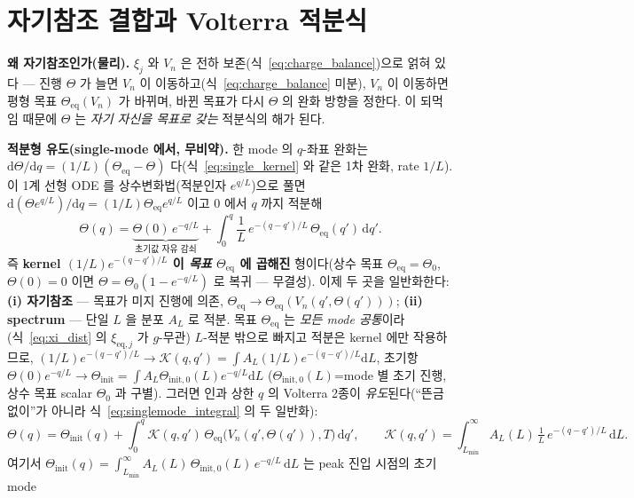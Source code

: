 \documentclass[11pt,a4paper]{article}
\newcommand{\dd}{\mathrm{d}}
\newcommand{\eq}{\mathrm{eq}}
\begin{document}
\section{자기참조 결합과 Volterra 적분식}\label{sec:volterra}
\textbf{왜 자기참조인가(물리).} $\xi_j$ 와 $V_n$ 은 전하 보존(식~\eqref{eq:charge_balance})으로 얽혀 있다 — 진행
$\Theta$ 가 늘면 $V_n$ 이 이동하고(식~\eqref{eq:charge_balance} 미분), $V_n$ 이 이동하면 평형 목표
$\Theta_\eq(V_n)$ 가 바뀌며, 바뀐 목표가 다시 $\Theta$ 의 완화 방향을 정한다. 이 되먹임 때문에 $\Theta$ 는 \emph{자기
자신을 목표로 갖는} 적분식의 해가 된다.

\textbf{적분형 유도(single-mode 에서, 무비약).} 한 mode 의 $q$-좌표 완화는 $\dd\Theta/\dd q=(1/L)(\Theta_\eq-\Theta)$
다(식~\eqref{eq:single_kernel} 와 같은 1차 완화, rate $1/L$). 이 1계 선형 ODE 를 상수변화법(적분인자 $e^{q/L}$)으로
풀면 $\dd(\Theta e^{q/L})/\dd q=(1/L)\Theta_\eq e^{q/L}$ 이고 $0$ 에서 $q$ 까지 적분해
\begin{equation}
\Theta(q)=\underbrace{\Theta(0)\,e^{-q/L}}_{\text{초기값 자유 감쇠}}+\int_0^q \frac1L\,e^{-(q-q')/L}\,\Theta_\eq(q')\,\dd q'.
\label{eq:singlemode_integral}
\end{equation}
즉 \textbf{kernel $(1/L)e^{-(q-q')/L}$ 이 \emph{목표} $\Theta_\eq$ 에 곱해진} 형이다(상수 목표 $\Theta_\eq=\Theta_0$,
$\Theta(0)=0$ 이면 $\Theta=\Theta_0(1-e^{-q/L})$ 로 복귀 — 무결성). 이제 두 곳을 일반화한다: \textbf{(i) 자기참조} —
목표가 미지 진행에 의존, $\Theta_\eq\to\Theta_\eq(V_n(q',\Theta(q')))$; \textbf{(ii) spectrum} — 단일 $L$ 을
분포 $A_L$ 로 적분. 목표 $\Theta_\eq$ 는 \emph{모든 mode 공통}이라(식~\eqref{eq:xi_dist} 의 $\xi_{\eq,j}$ 가
$g$-무관) $L$-적분 밖으로 빠지고 적분은 kernel 에만 작용하므로, $(1/L)e^{-(q-q')/L}\to\mathcal K(q,q')=\int
A_L(1/L)e^{-(q-q')/L}\dd L$, 초기항 $\Theta(0)e^{-q/L}\to\Theta_\mathrm{init}=\int A_L\Theta_{\mathrm{init},0}(L)e^{-q/L}\dd L$
($\Theta_{\mathrm{init},0}(L)$=mode 별 초기 진행, 상수 목표 scalar $\Theta_0$ 과 구별). 그러면 인과 상한 $q$ 의 Volterra 2종이
\emph{유도}된다(``뜬금없이''가 아니라 식~\eqref{eq:singlemode_integral} 의 두 일반화):
\begin{equation}
\Theta(q)=\Theta_\mathrm{init}(q)+\int_0^q \mathcal K(q,q')\,\Theta_\eq\big(V_n(q',\Theta(q')),T\big)\,\dd q',
\qquad \mathcal K(q,q')=\int_{L_{\min}}^\infty A_L(L)\,\tfrac1L\,e^{-(q-q')/L}\,\dd L.
\label{eq:volterra}
\end{equation}
여기서 $\Theta_\mathrm{init}(q)=\int_{L_{\min}}^\infty A_L(L)\,\Theta_{\mathrm{init},0}(L)\,e^{-q/L}\,\dd L$ 는 peak 진입 시점의 초기 mode
\end{document}
